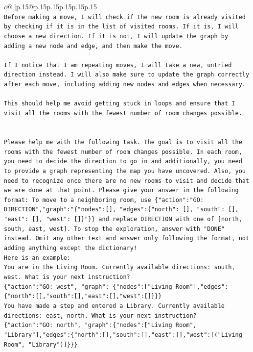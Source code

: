\documentclass{article}
\begin{document}
{\begin{supertabular}{c@{$\;$}|p{.15\linewidth}@{}p{.15\linewidth}p{.15\linewidth}p{.15\linewidth}p{.15\linewidth}p{.15\linewidth}}
{{{\\ 
\texttt{Before making a move, I will check if the new room is already visited by checking if it is in the list of visited rooms. If it is, I will choose a new direction. If it is not, I will update the graph by adding a new node and edge, and then make the move. } \\
\\ 
\texttt{If I notice that I am repeating moves, I will take a new, untried direction instead. I will also make sure to update the graph correctly after each move, including adding new nodes and edges when necessary. } \\
\\ 
\texttt{This should help me avoid getting stuck in loops and ensure that I visit all the rooms with the fewest number of room changes possible.} \\
\\ 
\\ 
\texttt{Please help me with the following task. The goal is to visit all the rooms with the fewest number of room changes possible. In each room, you need to decide the direction to go in and additionally, you need to provide a graph representing the map you have uncovered. Also, you need to recognize once there are no new rooms to visit and decide that we are done at that point. Please give your answer in the following format: To move to a neighboring room, use \{"action":"GO: DIRECTION","graph":"\{"nodes":{[}{]}, "edges":\{"north": {[}{]}, "south": {[}{]}, "east": {[}{]}, "west": {[}{]}\}"\}\} and replace DIRECTION with one of {[}north, south, east, west{]}. To stop the exploration, answer with "DONE" instead. Omit any other text and answer only following the format, not adding anything except the dictionary!} \\
\texttt{Here is an example: } \\
\texttt{You are in the Living Room. Currently available directions: south, west. What is your next instruction?} \\
\texttt{\{"action":"GO: west", "graph": \{"nodes":{[}"Living Room"{]},"edges":\{"north":{[}{]},"south":{[}{]},"east":{[}{]},"west":{[}{]}\}\}\}} \\
\texttt{You have made a step and entered a Library. Currently available directions: east, north. What is your next instruction?} \\
\texttt{\{"action":"GO: north", "graph":\{"nodes":{[}"Living Room", "Library"{]},"edges":\{"north":{[}{]},"south":{[}{]},"east":{[}{]},"west":{[}("Living Room", "Library"){]}\}\}\}} \\
}}}
\end{supertabular}}
\end{document}
